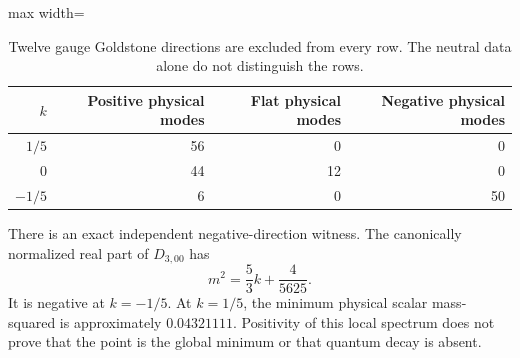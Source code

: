 \documentclass[11pt]{article}
\begin{document}
\begin{table}[ht]
\centering
\begin{adjustbox}{max width=\linewidth}\begin{tabular}{rrrr}
\toprule
$k$ & Positive physical modes & Flat physical modes & Negative physical modes\\
\midrule
$1/5$ & 56 & 0 & 0\\
$0$ & 44 & 12 & 0\\
$-1/5$ & 6 & 0 & 50\\
\bottomrule
\end{tabular}\end{adjustbox}
\caption{Twelve gauge Goldstone directions are excluded from every row.
The neutral data alone do not distinguish the rows.}
\label{tab:stability}
\end{table}

There is an exact independent negative-direction witness. The canonically
normalized real part of $D_{3,00}$ has
\begin{equation}
 m^2=\frac53k+\frac4{5625}.
\end{equation}
It is negative at $k=-1/5$. At $k=1/5$, the minimum physical scalar
mass-squared is approximately $0.04321111$. Positivity of this local spectrum
does not prove that the point is the global minimum or that quantum decay is
absent.
\end{document}
